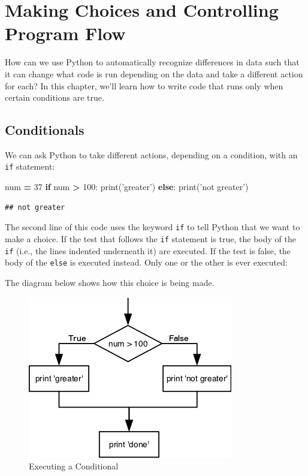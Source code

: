 \documentclass[]{book}
\newenvironment{Shaded}{\begin{snugshade}}{\end{snugshade}}
\newcommand{\BuiltInTok}[1]{#1}
\newcommand{\ControlFlowTok}[1]{\textcolor[rgb]{0.13,0.29,0.53}{\textbf{#1}}}
\newcommand{\DecValTok}[1]{\textcolor[rgb]{0.00,0.00,0.81}{#1}}
\newcommand{\NormalTok}[1]{#1}
\newcommand{\OperatorTok}[1]{\textcolor[rgb]{0.81,0.36,0.00}{\textbf{#1}}}
\newcommand{\StringTok}[1]{\textcolor[rgb]{0.31,0.60,0.02}{#1}}
\theoremstyle{definition}
\theoremstyle{definition}
\theoremstyle{definition}
\theoremstyle{remark}
\begin{document}
\hypertarget{making-choices-and-controlling-program-flow}{%
\chapter{Making Choices and Controlling Program
Flow}\label{making-choices-and-controlling-program-flow}}

How can we use Python to automatically recognize differences in data
such that it can change what code is run depending on the data and take
a different action for each? In this chapter, we'll learn how to write
code that runs only when certain conditions are true.

\hypertarget{conditionals}{%
\section{Conditionals}\label{conditionals}}

We can ask Python to take different actions, depending on a condition,
with an \texttt{if} statement:

\begin{Shaded}
\begin{Highlighting}[]
\NormalTok{num }\OperatorTok{=} \DecValTok{37}
\ControlFlowTok{if}\NormalTok{ num }\OperatorTok{>} \DecValTok{100}\NormalTok{:}
    \BuiltInTok{print}\NormalTok{(}\StringTok{'greater'}\NormalTok{)}
\ControlFlowTok{else}\NormalTok{:}
    \BuiltInTok{print}\NormalTok{(}\StringTok{'not greater'}\NormalTok{)}
\end{Highlighting}
\end{Shaded}

\begin{verbatim}
## not greater
\end{verbatim}

The second line of this code uses the keyword \texttt{if} to tell Python
that we want to make a choice. If the test that follows the \texttt{if}
statement is true, the body of the \texttt{if} (i.e., the lines indented
underneath it) are executed. If the test is false, the body of the
\texttt{else} is executed instead. Only one or the other is ever
executed:

The diagram below shows how this choice is being made.

\begin{figure}
\centering
\includegraphics{assets/python-flowchart-conditional.png}
\caption{Executing a Conditional}
\end{figure}
\end{document}
